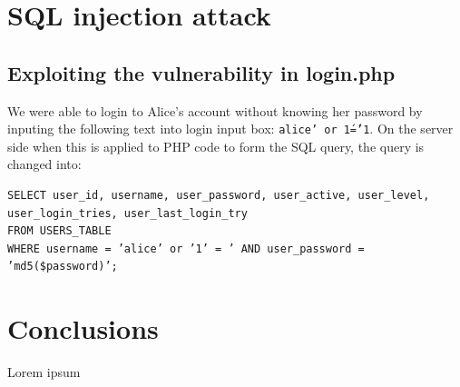 \documentclass[12pt, a4paper, pdflatex]{article}
\begin{document}
\section{SQL injection attack}

\subsection{Exploiting the vulnerability in login.php}

We were able to login to Alice's account without knowing her password by inputing the following
text into login input box: \texttt{alice' or \'1\'='1}. On the server side when this is applied
to PHP code to form the SQL query, the query is changed into:

\lstset{
  captionpos=b,
  frame=single,
  language=PHP,
  breaklines=true,
  label=sql1
}
\begin{lstlisting}
SELECT user_id, username, user_password, user_active, user_level,
user_login_tries, user_last_login_try
FROM USERS_TABLE
WHERE username = ’alice’ or ’1’ = ’ AND user_password = ’md5($password)’;
\end{lstlisting}



\section{Conclusions}

Lorem ipsum

\vfill


\end{document}

